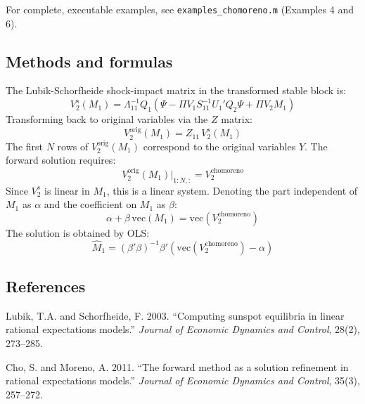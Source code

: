 \documentclass{article}
\begin{document}
\medskip
\noindent For complete, executable examples, see \texttt{examples\_chomoreno.m} (Examples 4 and 6).

\subsection{Methods and formulas}

The Lubik-Schorfheide shock-impact matrix in the transformed stable block is:
\[
V_2^s(M_1) = \Lambda_{11}^{-1} Q_1 \left(\Psi - \Pi V_1 S_{11}^{-1} U_1' Q_2 \Psi + \Pi V_2 M_1\right)
\]
Transforming back to original variables via the $Z$ matrix:
\[
V_2^{\text{orig}}(M_1) = Z_{11} \, V_2^s(M_1)
\]
The first $N$ rows of $V_2^{\text{orig}}(M_1)$ correspond to the original variables $Y$. The forward solution requires:
\[
V_2^{\text{orig}}(M_1)\big|_{1:N,:} = V_2^{\text{chomoreno}}
\]
Since $V_2^s$ is linear in $M_1$, this is a linear system. Denoting the part independent of $M_1$ as $\alpha$ and the coefficient on $M_1$ as $\beta$:
\[
\alpha + \beta \, \text{vec}(M_1) = \text{vec}(V_2^{\text{chomoreno}})
\]
The solution is obtained by OLS:
\[
\widehat{M}_1 = (\beta' \beta)^{-1} \beta' \left(\text{vec}(V_2^{\text{chomoreno}}) - \alpha\right)
\]

\subsection{References}

Lubik, T.A. and Schorfheide, F. 2003. ``Computing sunspot equilibria in linear rational expectations models.'' \textit{Journal of Economic Dynamics and Control}, 28(2), 273--285.

\medskip
\noindent Cho, S. and Moreno, A. 2011. ``The forward method as a solution refinement in rational expectations models.'' \textit{Journal of Economic Dynamics and Control}, 35(3), 257--272.
\end{document}
